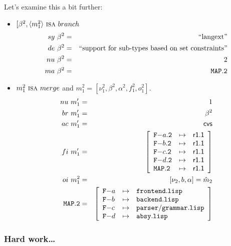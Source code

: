 \documentclass[fleqn, 10pt, a4paper]{report}
\begin{document}
Let's examine this a bit further:
\begin{itemize}
\item $[\beta^2, \langle m_1^2 \rangle\ \mbox{\textsc{isa}}\ \mathnormal{branch}$
\begin{eqnarray*}
\mathnormal{sy}\ \beta^2 &=& \mbox{``langext''} \\
\mathnormal{de}\ \beta^2 &=& \mbox{``support for sub-types based on set constraints''} \\
\mathnormal{nu}\ \beta^2 &=& 2 \\
\mathnormal{ma}\ \beta^2 &=& \mathtt{MAP.2}
\end{eqnarray*}

\item $m_1^2\ \mbox{\textsc{isa}}\ \mathnormal{merge}$ and
$m_1^2=[\nu_1^2, \beta^2, \alpha^2, f_1^2, o_1^2]$.
\begin{eqnarray*}
\mathnormal{nu}\ m'_1 &=& 1 \\
\mathnormal{br}\ m'_1 &=& \beta^2 \\
\mathnormal{ac}\ m'_1 &=& \mathsf{cvs} \\
\mathnormal{fi}\ m'_1 &=& \left[
\begin{array}{lcl}
\mathtt{F-}a\mathtt{.2} & \mapsto & \mathsf{r1.1} \\
\mathtt{F-}b\mathtt{.2} & \mapsto & \mathsf{r1.1} \\
\mathtt{F-}c\mathtt{.2} & \mapsto & \mathsf{r1.1} \\
\mathtt{F-}d\mathtt{.2} & \mapsto & \mathsf{r1.1} \\
\mathtt{MAP.2}         & \mapsto & \mathsf{r1.1} \\
\end{array}\right] \\
\mathnormal{oi}\ m_1^2 &=& [\nu_2, b, \alpha] = \hat m_2 \\
\mathtt{MAP.2} &=& \left[
\begin{array}{lcl}
\mathtt{F-}a &\mapsto& \mathtt{frontend.lisp} \\
\mathtt{F-}b &\mapsto& \mathtt{backend.lisp} \\
\mathtt{F-}c &\mapsto& \mathtt{parser/grammar.lisp} \\
\mathtt{F-}d &\mapsto& \mathtt{absy.lisp} \\
\end{array}\right]
\end{eqnarray*}
\end{itemize}

\subsubsection{Hard work\ldots}
\end{document}
